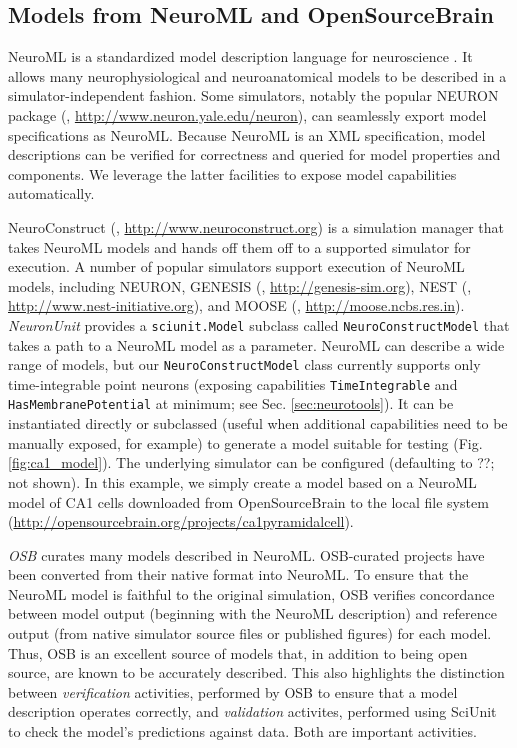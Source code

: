 \documentclass{frontiersSCNS}
\let\verbx\lstinline
\begin{document}
\subsection{Models from NeuroML and OpenSourceBrain}\label{sec:neuroml_models}
NeuroML is a standardized model description language for neuroscience \citep{gleeson_neuroml:_2010}. 
It allows many neurophysiological and neuroanatomical models to be described in a simulator-independent fashion. Some simulators, notably the popular NEURON package (\cite{carnevale_neuron_2006}, \url{http://www.neuron.yale.edu/neuron}), can seamlessly export model specifications as NeuroML. 
Because NeuroML is an XML specification, model descriptions can be verified for correctness and queried for model properties and components. We leverage the latter facilities to expose model capabilities automatically. %

NeuroConstruct (\cite{gleeson_neuroconstruct:_2007}, \url{http://www.neuroconstruct.org}) is a simulation manager that takes NeuroML models and hands off them off to a supported simulator for execution. A number of popular simulators support execution of NeuroML models, including NEURON, GENESIS (\cite{bower_genesis_2007}, \url{http://genesis-sim.org}), NEST (\cite{gewaltig_nest_2007}, \url{http://www.nest-initiative.org}), and MOOSE (\cite{ray_moose_2008}, \url{http://moose.ncbs.res.in}). 
\textit{NeuronUnit} provides a \verbx{sciunit.Model} subclass called \verbx{NeuroConstructModel} that takes a path to a NeuroML model as a parameter.  
NeuroML can describe a wide range of models, but our \verbx{NeuroConstructModel} class currently supports only  time-integrable point neurons (exposing capabilities \verbx{TimeIntegrable} and \verbx{HasMembranePotential} at minimum; see Sec. \ref{sec:neurotools}). 
It can be instantiated directly or subclassed (useful when additional capabilities need to be manually exposed, for example) to generate a model suitable for testing (Fig. \ref{fig:ca1_model}). The underlying simulator can be configured (defaulting to ??; not shown). In this example, we simply create a model based on a NeuroML model of CA1 cells downloaded from OpenSourceBrain to the local file system (\url{http://opensourcebrain.org/projects/ca1pyramidalcell}).  

\textit{OSB} curates many models described in NeuroML. 
OSB-curated projects have been converted from their native format into NeuroML. To ensure that the NeuroML model is faithful to the original simulation, OSB verifies concordance between model output (beginning with the NeuroML description) and reference output (from native simulator source files or published figures) for each model. 
Thus, OSB is an excellent source of models that, in addition to being open source, are known to be accurately described. This also highlights the distinction between \emph{verification} activities, performed by OSB to ensure that a model description operates correctly, and \emph{validation} activites, performed using SciUnit to check the model's predictions against data. Both are important activities.
\end{document}
